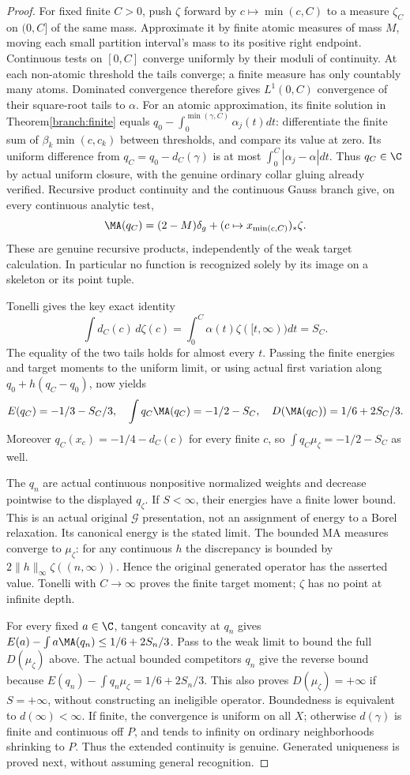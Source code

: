 \begin{proof}
For fixed finite $C>0$, push $\zeta$ forward by $c\mapsto\min(c,C)$
to a measure $\zeta_C$ on $(0,C]$ of the same mass. Approximate it by
finite atomic measures of mass $M$, moving each small partition interval's
mass to its positive right endpoint. Continuous tests on $[0,C]$ converge
uniformly by their moduli of continuity. At each non-atomic threshold the
tails converge; a finite measure has only countably many atoms. Dominated
convergence therefore gives $L^1(0,C)$ convergence of their square-root
tails to $\alpha$. For an atomic approximation, its finite solution in
Theorem\ref{branch:finite} equals $q_0-\int_0^{\min(\gamma,C)}\alpha_j(t)dt$:
differentiate the finite sum of $\beta_k\min(c,c_k)$ between thresholds,
and compare its value at zero. Its uniform difference from
$q_C=q_0-d_C(\gamma)$ is at most $\int_0^C|\alpha_j-\alpha|dt$.
Thus $q_C\in\C$ by actual uniform closure, with the genuine ordinary
collar gluing already verified. Recursive product continuity and the
continuous Gauss branch give, on every continuous analytic test,
\[
 \MA(q_C)=(2-M)\delta_g+(c\mapsto x_{\min(c,C)})_*\zeta.
\]
These are genuine recursive products, independently of the weak target
calculation. In particular no function is recognized solely by its image
on a skeleton or its point tuple.

Tonelli gives the key exact identity
\[
 \int d_C(c)\,d\zeta(c)
 =\int_0^C\alpha(t)\zeta([t,\infty))dt=S_C.
\]
The equality of the two tails holds for almost every $t$. Passing the
finite energies and target moments to the uniform limit, or using actual
first variation along $q_0+h(q_C-q_0)$, now yields
\[
 E(q_C)=-1/3-S_C/3,\quad \int q_C\MA(q_C)=-1/2-S_C,
 \quad D(\MA(q_C))=1/6+2S_C/3.
\]
Moreover $q_C(x_c)=-1/4-d_C(c)$ for every finite $c$, so
$\int q_C\mu_\zeta=-1/2-S_C$ as well.

The $q_n$ are actual continuous nonpositive normalized weights and decrease
pointwise to the displayed $q_\zeta$. If $S<\infty$, their energies have a
finite lower bound. This is an actual original $\mathcal G$ presentation,
not an assignment of energy to a Borel relaxation. Its canonical energy
is the stated limit. The bounded MA measures converge to $\mu_\zeta$:
for any continuous $h$ the discrepancy is bounded by
$2\|h\|_\infty\zeta((n,\infty))$. Hence the original generated operator
has the asserted value. Tonelli with $C\to\infty$ proves the finite target
moment; $\zeta$ has no point at infinite depth.

For every fixed $a\in\C$, tangent concavity at $q_n$ gives
$E(a)-\int a\MA(q_n)\le1/6+2S_n/3$. Pass to the weak limit to bound the
full $D(\mu_\zeta)$ above. The actual bounded competitors $q_n$ give the
reverse bound because $E(q_n)-\int q_n\mu_\zeta=1/6+2S_n/3$.
This also proves $D(\mu_\zeta)=+\infty$ if $S=+\infty$, without constructing
an ineligible operator. Boundedness is equivalent to $d(\infty)<\infty$.
If finite, the convergence is uniform on all $X$; otherwise $d(\gamma)$
is finite and continuous off $P$, and tends to infinity on ordinary
neighborhoods shrinking to $P$. Thus the extended continuity is genuine.
Generated uniqueness is proved next, without assuming general recognition.
\end{proof}

